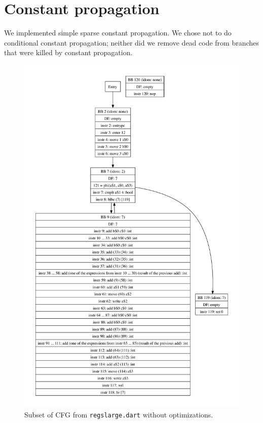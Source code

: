 \documentclass[10pt,twocolumn]{article}
\begin{document}
\section{Constant propagation}

We implemented simple sparse constant propagation. We chose not to do
conditional constant propagation; neither did we remove dead code from
branches that were killed by constant
propagation.


\begin{figure}
\begin{center}
\vspace{-1in}
  \includegraphics[height=0.75\paperheight]{figs/andre1.pdf}
\begin{minipage}{0.95\columnwidth}
  \caption{\label{fig:regslarge-nothing} Subset of CFG from \texttt{regslarge.dart} without optimizations.}
\end{minipage}
\end{center}
\end{figure}
\end{document}
